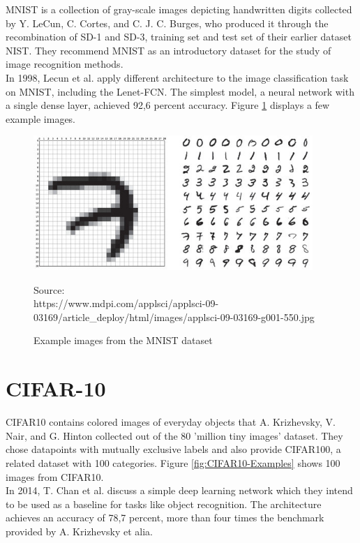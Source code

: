 MNIST is a collection of gray-scale images depicting handwritten digits collected by Y. LeCun, C. Cortes, and C. J. C. Burges, who produced it through the recombination of SD-1 and SD-3, training set and test set of their earlier dataset NIST. They recommend MNIST as an introductory dataset for the study of image recognition methods\cite{MNIST}.\\
In 1998, Lecun et al. apply different architecture to the image classification task on MNIST, including the Lenet-FCN. The simplest model, a neural network with a single dense layer, achieved 92,6 percent accuracy.\cite{lecun1998gradient}
Figure \ref{fig:MNIST-Examples} displays a few example images.
\begin{figure}
	\centering
	\includegraphics[width=400px]{gfx/6-Datasets/MNIST_examples_clean.jpg}
	\caption{Example images from the MNIST dataset}
	\vspace{7pt}
	\footnotesize{
		Source:\\
		https://www.mdpi.com/applsci/applsci-09-03169/article\_deploy/html/images/applsci-09-03169-g001-550.jpg
	}
	\label{fig:MNIST-Examples}
\end{figure}

\section{CIFAR-10}
CIFAR10 contains colored images of everyday objects that A. Krizhevsky, V. Nair, and G. Hinton collected out of the 80 'million tiny images' dataset. They chose datapoints with mutually exclusive labels and also provide CIFAR100, a related dataset with 100 categories. Figure \ref{fig:CIFAR10-Examples} shows 100 images from CIFAR10. \cite{CIFAR}\\
In 2014, T. Chan et al. discuss a simple deep learning network which they intend to be used as a baseline for tasks like object recognition. The architecture achieves an accuracy of 78,7 percent, more than four times the benchmark provided by A. Krizhevsky et alia.\cite{CIFAR-Baseline}

